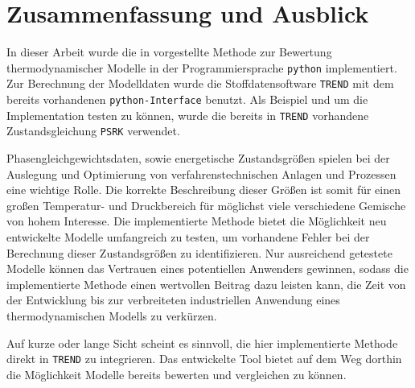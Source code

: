 \documentclass[../thesis.tex]{subfiles}
\begin{document}
\chapter{Zusammenfassung und Ausblick}

In dieser Arbeit wurde die in \cite{jaubert2020benchmark} vorgestellte Methode zur Bewertung thermodynamischer Modelle in der Programmiersprache \texttt{python} implementiert. Zur Berechnung der Modelldaten wurde die Stoffdatensoftware \texttt{TREND} mit dem bereits vorhandenen \texttt{python-Interface} benutzt. Als Beispiel und um die Implementation testen zu können, wurde die bereits in \texttt{TREND} vorhandene Zustandsgleichung \texttt{PSRK} verwendet.

Phasengleichgewichtsdaten, sowie energetische Zustandsgrößen spielen bei der Auslegung und Optimierung von verfahrenstechnischen Anlagen und Prozessen eine wichtige Rolle. Die korrekte Beschreibung dieser Größen ist somit für einen großen Temperatur- und Druckbereich für möglichst viele verschiedene Gemische von hohem Interesse. Die implementierte Methode bietet die Möglichkeit neu entwickelte Modelle umfangreich zu testen, um vorhandene Fehler bei der Berechnung dieser Zustandsgrößen zu identifizieren. Nur ausreichend getestete Modelle können das Vertrauen eines potentiellen Anwenders gewinnen, sodass die implementierte Methode einen wertvollen Beitrag dazu leisten kann, die Zeit von der Entwicklung bis zur verbreiteten industriellen Anwendung eines thermodynamischen Modells zu verkürzen.

Auf kurze oder lange Sicht scheint es sinnvoll, die hier implementierte Methode direkt in \texttt{TREND} zu integrieren. Das entwickelte Tool bietet auf dem Weg dorthin die Möglichkeit Modelle bereits bewerten und vergleichen zu können.
\end{document}
